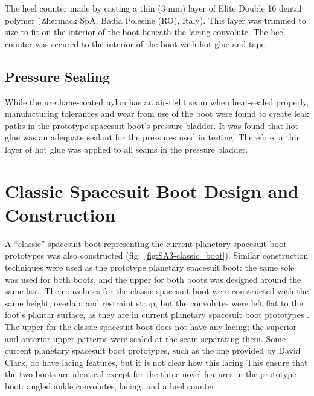 \documentclass[defaultstyle,11pt]{comps}
\begin{document}
The heel counter made by casting a thin (3 mm) layer of Elite Double 16 dental polymer (Zhermack SpA, Badia Polesine (RO), Italy).
This layer was trimmed to size to fit on the interior of the boot beneath the lacing convolute.
The heel counter was secured to the interior of the boot with hot glue and tape.

\hypertarget{pressure-sealing}{%
\subsection{Pressure Sealing}\label{pressure-sealing}}

While the urethane-coated nylon has an air-tight seam when heat-sealed properly, manufacturing tolerances and wear from use of the boot were found to create leak paths in the prototype spacesuit boot's pressure bladder.
It was found that hot glue was an adequate sealant for the pressures used in testing.
Therefore, a thin layer of hot glue was applied to all seams in the pressure bladder.

\hypertarget{classic-spacesuit-boot-design-and-construction}{%
\section{Classic Spacesuit Boot Design and Construction}\label{classic-spacesuit-boot-design-and-construction}}

A ``classic'' spacesuit boot representing the current planetary spacesuit boot prototypes was also constructed (fig.~\ref{fig:SA3-classic_boot}).
Similar construction techniques were used as the prototype planetary spacesuit boot: the same sole was used for both boots, and the upper for both boots was designed around the same last.
The convolutes for the classic spacesuit boot were constructed with the same height, overlap, and restraint strap, but the convolutes were left flat to the foot's plantar surface, as they are in current planetary spacesuit boot prototypes \citep{Ross2002}.
The upper for the classic spacesuit boot does not have any lacing; the superior and anterior upper patterns were sealed at the seam separating them.
Some current planetary spacesuit boot prototypes, such as the one provided by David Clark, do have lacing features, but it is not clear how this lacing
This ensure that the two boots are identical except for the three novel features in the prototype boot: angled ankle convolutes, lacing, and a heel counter.
\end{document}
